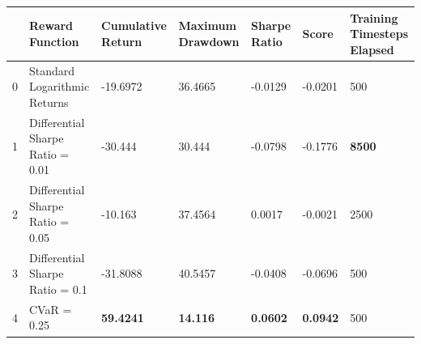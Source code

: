\begin{tabular}{lllllll}
\toprule
 & Reward Function & Cumulative Return & Maximum Drawdown & Sharpe Ratio & Score & Training Timesteps Elapsed \\
\midrule
0 & Standard Logarithmic Returns & -19.6972 & 36.4665 & -0.0129 & -0.0201 & 500 \\
1 & Differential Sharpe Ratio = 0.01 & -30.444 & 30.444 & -0.0798 & -0.1776 & \textbf{8500} \\
2 & Differential Sharpe Ratio = 0.05 & -10.163 & 37.4564 & 0.0017 & -0.0021 & 2500 \\
3 & Differential Sharpe Ratio = 0.1 & -31.8088 & 40.5457 & -0.0408 & -0.0696 & 500 \\
4 & CVaR = 0.25 & \textbf{59.4241} & \textbf{14.116} & \textbf{0.0602} & \textbf{0.0942} & 500 \\
\bottomrule
\end{tabular}
